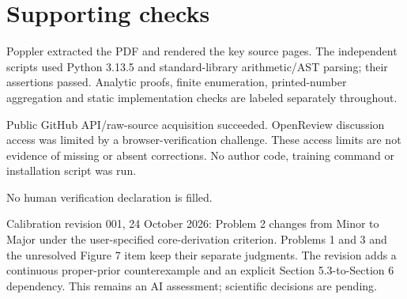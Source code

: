 \documentclass[10pt]{article}
\begin{document}
\section*{Supporting checks}
Poppler extracted the PDF and rendered the key source pages. The independent scripts used Python 3.13.5 and standard-library arithmetic/AST parsing; their assertions passed. Analytic proofs, finite enumeration, printed-number aggregation and static implementation checks are labeled separately throughout.\par
Public GitHub API/raw-source acquisition succeeded. OpenReview discussion access was limited by a browser-verification challenge. These access limits are not evidence of missing or absent corrections. No author code, training command or installation script was run.\par
No human verification declaration is filled.\par
Calibration revision 001, 24 October 2026: Problem 2 changes from Minor to Major under the user-specified core-derivation criterion. Problems 1 and 3 and the unresolved Figure 7 item keep their separate judgments. The revision adds a continuous proper-prior counterexample and an explicit Section 5.3-to-Section 6 dependency. This remains an AI assessment; scientific decisions are pending.\par
\end{document}
